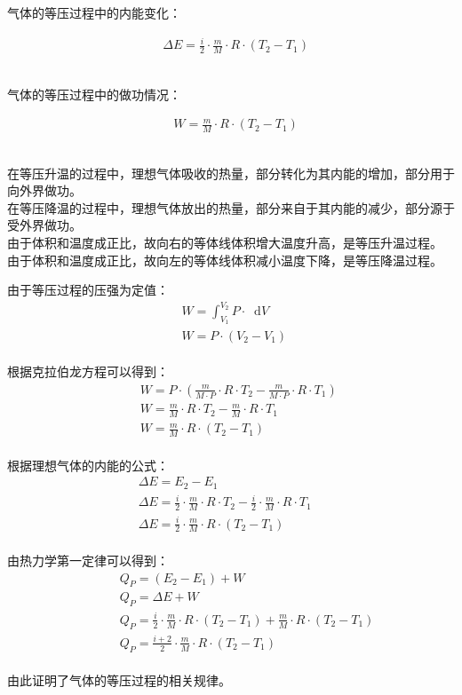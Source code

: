 \documentclass[UTF8]{ctexart}
\newcommand*{\dif}{\mathop{}\!\mathrm{d}}
\begin{document}
    气体的等压过程中的内能变化：
    \begin{large}
        \begin{align*}
            &\Delta E=\frac{i}{2}\cdot\frac{m}{M}\cdot R\cdot(T_2-T_1)
        \end{align*}
    \end{large}\\
    气体的等压过程中的做功情况：
    \begin{large}
        \begin{align*}
            &W=\frac{m}{M}\cdot R\cdot(T_2-T_1)
        \end{align*}
    \end{large}\\
    在等压升温的过程中，理想气体吸收的热量，部分转化为其内能的增加，部分用于向外界做功。\\[3mm]
    在等压降温的过程中，理想气体放出的热量，部分来自于其内能的减少，部分源于受外界做功。\\[3mm]
    由于体积和温度成正比，故向右的等体线体积增大温度升高，是等压升温过程。\\[3mm]
    由于体积和温度成正比，故向左的等体线体积减小温度下降，是等压降温过程。

\newpage

    由于等压过程的压强为定值：
    \begin{align}
        &W=\int_{V_1}^{V_2} P\cdot\dif V~~~~~~~~\\[4mm]
        &W=P\cdot(V_2-V_1)
    \end{align}\\
    根据克拉伯龙方程可以得到：
    \begin{align}
        &~~W=P\cdot\left(\frac{m}{M\cdot P}\cdot R\cdot T_2-\frac{m}{M\cdot P}\cdot R\cdot T_1\right)\\[4mm]
        &~~W=\frac{m}{M}\cdot R\cdot T_2-\frac{m}{M}\cdot R\cdot T_1\\[4mm]
        &~~W=\frac{m}{M}\cdot R\cdot (T_2-T_1)
    \end{align}\\
    根据理想气体的内能的公式：
    \begin{align}
        &\Delta E=E_2-E_1\\[4mm]
        &\Delta E=\frac{i}{2}\cdot\frac{m}{M}\cdot R\cdot T_2-\frac{i}{2}\cdot\frac{m}{M}\cdot R\cdot T_1~~~~~~~~\\[4mm]
        &\Delta E=\frac{i}{2}\cdot\frac{m}{M}\cdot R\cdot (T_2-T_1)
    \end{align}\\
    由热力学第一定律可以得到：
    \begin{align}
        &~~~~~~~~Q_P=(E_2-E_1)+W\\[4mm]
        &~~~~~~~~Q_P=\Delta E+W\\[4mm]
        &~~~~~~~~Q_P=\frac{i}{2}\cdot\frac{m}{M}\cdot R\cdot(T_2-T_1)+\frac{m}{M}\cdot R\cdot(T_2-T_1)\\[4mm]
        &~~~~~~~~Q_P=\frac{i+2}{2}\cdot\frac{m}{M}\cdot R\cdot(T_2-T_1)
    \end{align}\\
    由此证明了气体的等压过程的相关规律。
\end{document}
